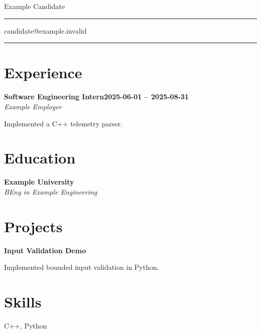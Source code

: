 \documentclass[letterpaper,10pt]{article}
\newcommand{\documentTitle}[2]{
  \begin{center}
    {\Huge\color{accentTitle} #1}
    \vspace{10pt}
    {\color{accentLine} \hrule}
    \vspace{2pt}
    \footnotesize{#2}
    \vspace{2pt}
    {\color{accentLine} \hrule}
  \end{center}
}
\newcommand{\heading}[2]{
  \hspace{10pt}#1\hfill#2\\
}
\newcommand{\headingBf}[2]{
  \heading{\textbf{#1}}{\textbf{#2}}
}
\newcommand{\headingIt}[2]{
  \heading{\textit{#1}}{\textit{#2}}
}
\newenvironment{resume_list}{
  \vspace{-7pt}
  \begin{itemize}[itemsep=-1.5bp, parsep=1pt, leftmargin=30pt]
}{
  \end{itemize}
}
\begin{document}
\documentTitle{Example Candidate}{candidate@example.invalid}

\section{Experience}

\headingBf{Software Engineering Intern}{2025-06-01 -- 2025-08-31}
\headingIt{Example Employer}{}
\begin{resume_list}

\item Implemented a C++ telemetry parser.

\end{resume_list}



\section{Education}

\headingBf{Example University}{}
\headingIt{BEng in Example Engineering}{}



\section{Projects}

\headingBf{Input Validation Demo}{}
\begin{resume_list}

\item Implemented bounded input validation in Python.

\end{resume_list}



\section{Skills}
C++, Python
\end{document}
